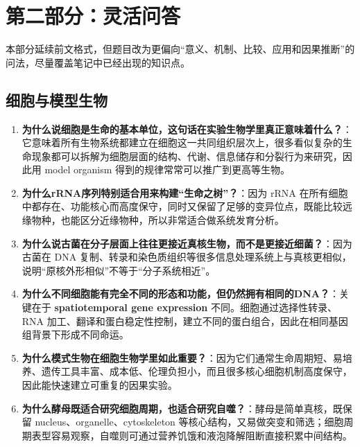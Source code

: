 \documentclass[12pt,fontset=none]{ctexart}
\begin{document}
\section*{第二部分：灵活问答}
本部分延续前文格式，但题目改为更偏向“意义、机制、比较、应用和因果推断”的问法，尽量覆盖笔记中已经出现的知识点。

\subsection*{细胞与模型生物}
\begin{enumerate}
\item \textbf{为什么说细胞是生命的基本单位，这句话在实验生物学里真正意味着什么？}：它意味着所有生物系统都建立在细胞这一共同组织层次上，很多看似复杂的生命现象都可以拆解为细胞层面的结构、代谢、信息储存和分裂行为来研究，因此用 model organism 得到的规律常常可以推广到更高等生物。

\item \textbf{为什么rRNA序列特别适合用来构建“生命之树”？}：因为 rRNA 在所有细胞中都存在、功能核心而高度保守，同时又保留了足够的变异位点，既能比较远缘物种，也能区分近缘物种，所以非常适合做系统发育分析。

\item \textbf{为什么说古菌在分子层面上往往更接近真核生物，而不是更接近细菌？}：因为古菌在 DNA 复制、转录和染色质组织等很多信息处理系统上与真核更相似，说明“原核外形相似”不等于“分子系统相近”。

\item \textbf{为什么不同细胞能有完全不同的形态和功能，但仍然拥有相同的DNA？}：关键在于 \textbf{spatiotemporal gene expression} 不同。细胞通过选择性转录、RNA 加工、翻译和蛋白稳定性控制，建立不同的蛋白组合，因此在相同基因组背景下形成不同命运。

\item \textbf{为什么模式生物在细胞生物学里如此重要？}：因为它们通常生命周期短、易培养、遗传工具丰富、成本低、伦理负担小，而且很多核心细胞机制高度保守，因此能快速建立可重复的因果实验。

\item \textbf{为什么酵母既适合研究细胞周期，也适合研究自噬？}：酵母是简单真核，既保留 nucleus、organelle、cytoskeleton 等核心结构，又易做突变和筛选；细胞周期表型容易观察，自噬则可通过营养饥饿和液泡降解阻断直接积累中间结构。
\end{enumerate}

\end{document}
